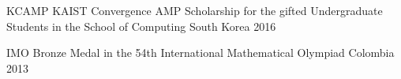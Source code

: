 



\begin{cvhonors}

  \cvhonor
    {KCAMP} %
    {KAIST Convergence AMP Scholarship for the gifted Undergraduate Students in the School of Computing} %
    {South Korea} %
    {2016} %

  \cvhonor
    {IMO} %
    {Bronze Medal in the 54th International Mathematical Olympiad} %
    {Colombia} %
    {2013} %

\end{cvhonors}

